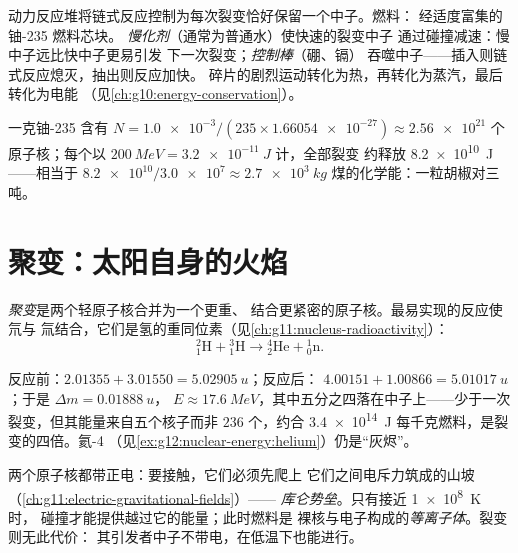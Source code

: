 \begin{definition}[驯服的反应堆]\label{def:g12:nuclear-energy:reactor}
动力反应堆将链式反应控制为每次裂变恰好保留一个中子。燃料：
经适度富集的铀-235 燃料芯块。
\emph{慢化剂}（通常为普通水）使快速的裂变中子
通过碰撞减速：慢中子远比快中子更易引发
下一次裂变；\emph{控制棒}（硼、镉）
吞噬中子——插入则链式反应熄灭，抽出则反应加快。
碎片的剧烈运动转化为热，再转化为蒸汽，最后转化为电能
（见\cref{ch:g10:energy-conservation}）。
\end{definition}

\begin{example}[胡椒粒对卡车]\label{ex:g12:nuclear-energy:gram}
一克铀-235 含有
$N = \num{1.0e-3} / (235 \times \num{1.66054e-27}) \approx \num{2.56e21}$
个原子核；每个以 $\qty{200}{MeV} = \qty{3.2e-11}{J}$ 计，全部裂变
约释放 \qty{8.2e10}{J}——相当于 $\num{8.2e10} /
\num{3.0e7} \approx \qty{2.7e3}{kg}$ 煤的化学能：一粒胡椒对三吨。
\end{example}

\section{聚变：太阳自身的火焰}

\begin{definition}[聚变]\label{def:g12:nuclear-energy:fusion}
\emph{聚变}是两个轻原子核合并为一个更重、
结合更紧密的原子核。最易实现的反应使氘与
氚结合，它们是氢的重同位素（见\cref{ch:g11:nucleus-radioactivity}）：
\[
{}^{2}_{1}\mathrm{H} + {}^{3}_{1}\mathrm{H} \longrightarrow
{}^{4}_{2}\mathrm{He} + {}^{1}_{0}\mathrm{n}.
\]
\end{definition}

\begin{example}[D--T，称量]\label{ex:g12:nuclear-energy:dt}
反应前：$2.01355 + 3.01550 = \qty{5.02905}{u}$；反应后：
$4.00151 + 1.00866 = \qty{5.01017}{u}$；于是 $\Delta m = \qty{0.01888}{u}$，
$E \approx \qty{17.6}{MeV}$，其中五分之四落在中子上——少于一次
裂变，但其能量来自五个核子而非 $236$ 个，约合 \qty{3.4e14}{J}
每千克燃料，是裂变的四倍。氦-4
（见\cref{ex:g12:nuclear-energy:helium}）仍是“灰烬”。
\end{example}

\begin{definition}[库仑势垒]\label{def:g12:nuclear-energy:barrier}
两个原子核都带正电：要接触，它们必须先爬上
它们之间电斥力筑成的山坡（\cref{ch:g11:electric-gravitational-fields}）——
\emph{库仑势垒}。只有接近 \qty{1e8}{K} 时，
碰撞才能提供越过它的能量；此时燃料是
裸核与电子构成的\emph{等离子体}。裂变则无此代价：
其引发者中子不带电，在低温下也能进行。
\end{definition}


